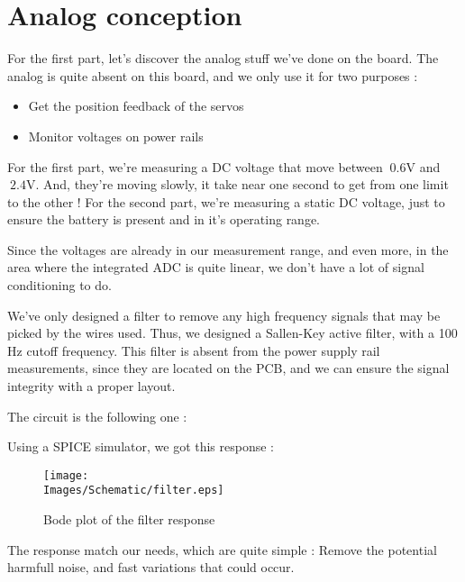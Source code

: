 \section{Analog conception}
For the first part, let's discover the analog stuff we've done on the board.
The analog is quite absent on this board, and we only use it for two purposes :

\begin{itemize}[noitemsep]
    \item   Get the position feedback of the servos
    \item   Monitor voltages on power rails
\end{itemize}

For the first part, we're measuring a DC voltage that move between $~0.6 \si{\volt}$
and $~2.4 \si{\volt}$. And, they're moving slowly, it take near one second to get
from one limit to the other ! For the second part, we're measuring a static DC voltage,
just to ensure the battery is present and in it's operating range.

Since the voltages are already in our measurement range, and even more, in the area
where the integrated ADC is quite linear, we don't have a lot of signal conditioning
to do.

We've only designed a filter to remove any high frequency signals that may be picked
by the wires used. Thus, we designed a Sallen-Key active filter, with a 100 Hz cutoff
frequency. This filter is absent from the power supply rail measurements, since they
are located on the PCB, and we can ensure the signal integrity with a proper layout.

The circuit is the following one :


Using a SPICE simulator, we got this response :
\begin{figure}[!hbt]
    \centering
    \texttt{[image: \\Images/Schematic/filter.eps]}
    \caption{Bode plot of the filter response}
\end{figure}
\FloatBarrier

The response match our needs, which are quite simple : Remove the potential harmfull noise,
and fast variations that could occur.